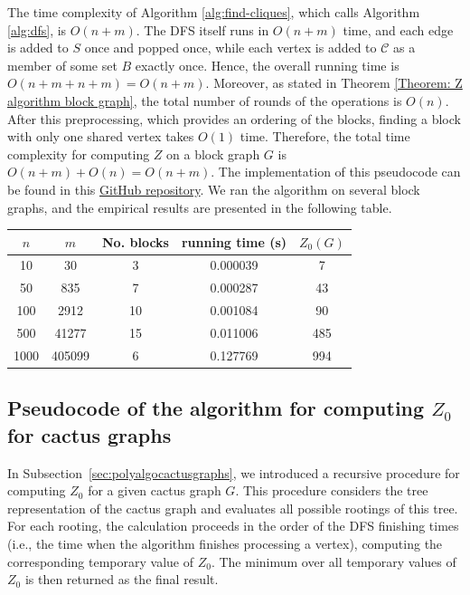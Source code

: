 \documentclass[11pt]{article}
\theoremstyle{plain}
\theoremstyle{definition}
\theoremstyle{remark}
\begin{document}
The time complexity of Algorithm \ref{alg:find-cliques}, which calls Algorithm \ref{alg:dfs}, is $O(n+m)$. The DFS itself runs in $O(n+m)$ time, and each edge is added to $S$ once and popped once, while each vertex is added to $\mathcal{C}$ as a member of some set $B$ exactly once. Hence, the overall running time is $O(n+m + n + m) = O(n+m)$. Moreover, as stated in Theorem \ref{Theorem: Z algorithm block graph}, the total number of rounds of the operations is $O(n)$. After this preprocessing, which provides an ordering of the blocks, finding a block with only one shared vertex takes $O(1)$ time. Therefore, the total time complexity for computing $Z$ on a block graph $G$ is $O(n+m) + O(n) = O(n+m)$. The implementation of this pseudocode can be found in this \href{https://github.com/sanazmgh/Zq-Forcing-Number-Algorithms}{GitHub repository}.
We ran the algorithm on several block graphs, and the empirical results are presented in the following table.
\begin{table}[H]
\centering
\begin{tabular}{|c c c c c |} 
 \hline
$n$ & $m$ & No. blocks & running time (s) & $Z_0(G)$ \\
\hline
    10   & 30   & 3    & 0.000039   & 7 \\
    50   & 835   & 7   & 0.000287 & 43\\
    100   & 2912   & 10  & 0.001084 & 90 \\
    500   & 41277   & 15   & 0.011006   & 485 \\
    1000  & 405099   & 6   & 0.127769 & 994 \\
\hline
\end{tabular}
\end{table}


\newpage

\subsection{Pseudocode of the algorithm for computing \texorpdfstring{\(Z_0\)}{Z0} for cactus graphs}\label{apx: code cactus}


In Subsection~\ref{sec:polyalgocactusgraphs}, we introduced a recursive procedure for computing $Z_0$ for a given cactus graph $G$. This procedure considers the tree representation of the cactus graph and evaluates all possible rootings of this tree. For each rooting, the calculation proceeds in the order of the DFS finishing times (i.e., the time when the algorithm finishes processing a vertex), computing the corresponding temporary value of $Z_0$. The minimum over all temporary values of $Z_0$ is then returned as the final result.
\end{document}
